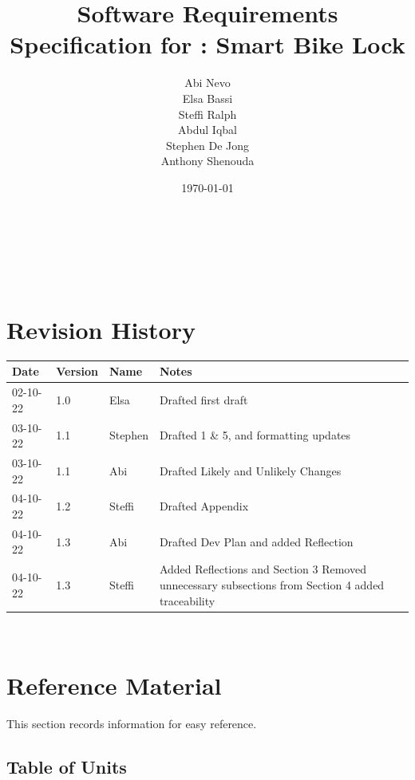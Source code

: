 \documentclass[12pt]{article}
\begin{document}
\title{Software Requirements Specification for \progname: Smart Bike Lock} 
\author{Abi Nevo\\Elsa Bassi\\Steffi Ralph\\Abdul Iqbal\\Stephen De Jong\\Anthony Shenouda}
\date{\today}
	
\maketitle

~\newpage


\tableofcontents

~\newpage

\section*{Revision History}

\begin{tabularx}{\textwidth}{p{2cm}p{2cm}p{2cm}X}
\toprule {\bf Date} & {\bf Version} & {\bf Name} & {\bf Notes}\\
\midrule
02-10-22 & 1.0 & Elsa & Drafted first draft\\
03-10-22& 1.1 & Stephen & Drafted 1 \& 5, and formatting updates\\
03-10-22 & 1.1 & Abi & Drafted Likely and Unlikely Changes\\
04-10-22& 1.2 & Steffi & Drafted Appendix\\
04-10-22 & 1.3 & Abi & Drafted Dev Plan and added Reflection\\
04-10-22 & 1.3 & Steffi & Added Reflections and Section 3 Removed unnecessary subsections from Section 4 added traceability\\
\bottomrule
\end{tabularx}

~\newpage

\section{Reference Material}

This section records information for easy reference.

\subsection{Table of Units}
\end{document}
